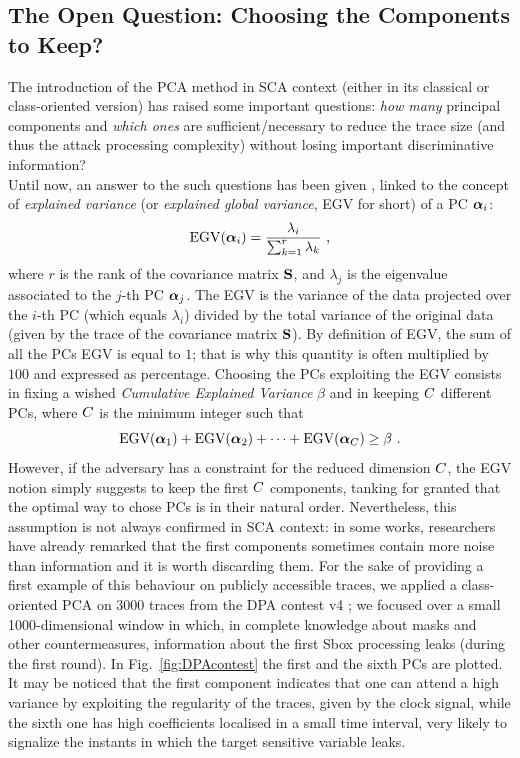 \subsection{The Open Question: Choosing the Components to Keep?}\label{sec:ELV}
The introduction of the PCA method in SCA context (either in its classical or class-oriented version)  has raised some important questions: \textit{how many} principal components and \textit{which ones} are sufficient/necessary to reduce the trace size (and thus the attack processing complexity) without losing important discriminative information?\\

Until now, an answer to the such questions has been given \cite{choudary2014efficient}, linked to the concept of {\em explained variance} (or {\em explained global variance}, EGV for short) of a PC $\boldsymbol\alpha_i$:
\begin{equation}\label{eq:EGV}
\mathrm{EGV}(\boldsymbol\alpha_i) =  \frac{\lambda_i}{\sum_{k=1}^r\lambda_k} \mbox{ ,}
\end{equation}
where $r$ is the rank of the covariance matrix $\textbf{S}$, and $\lambda_j$ is the eigenvalue associated to the $j$-th PC $\boldsymbol\alpha_j$. The EGV is the variance of the data projected over the $i$-th PC (which equals $\lambda_i$) divided by the total variance of the original data (given by the trace of the covariance matrix $\textbf{S}$). By definition of EGV, the sum of all the PCs EGV is equal to $1$; that is why this quantity is often multiplied by $100$ and expressed as percentage.
Choosing the PCs exploiting the EGV consists in fixing a wished {\em Cumulative Explained Variance} $\beta$ and in keeping $C$ different PCs, where $C$ is the minimum integer such that
\begin{equation}
\mbox{EGV}(\boldsymbol\alpha_1) +\mbox{EGV}(\boldsymbol\alpha_2) + \dots +\mbox{EGV}(\boldsymbol\alpha_C) \geq \beta \mbox{ .}
\end{equation}
However, if the adversary has a constraint for the reduced dimension $C$, the EGV notion simply suggests to keep the first $C$ components, tanking for granted that the optimal way to chose PCs is in their natural order. Nevertheless, this assumption is not always confirmed in SCA context: in some works, researchers have already remarked that the first components sometimes contain more noise than information \cite{Batina2012,specht} and it is worth discarding them. For the sake of providing a first example of this behaviour on publicly accessible traces, we applied a class-oriented PCA on 3000 traces from the DPA contest v4 \cite{DPAcontest}; we focused over a small 1000-dimensional window in which, in complete knowledge about masks and other countermeasures, information about the first Sbox processing leaks (during the first round). In Fig.~\ref{fig:DPAcontest} the first and the sixth PCs are plotted. It may be noticed that the first component indicates that one can attend a high variance by exploiting the regularity of the traces, given by the clock signal, while the sixth one has high coefficients localised in a small time interval, very likely to signalize the instants in which the target sensitive variable leaks.

